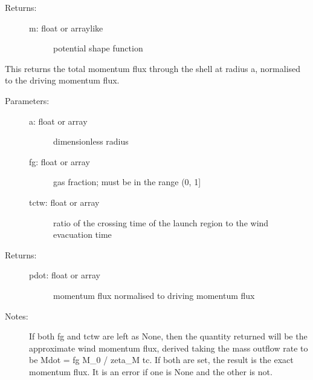 \documentclass[letterpaper,10pt,english]{sphinxmanual}
\begin{document}
\begin{fulllineitems}
\begin{fulllineitems}
\begin{description}
\begin{description}
\end{description}

\item[{Returns:}] \leavevmode\begin{description}
\item[{m: float or arraylike}] \leavevmode
potential shape function

\end{description}

\end{description}

\end{fulllineitems}


\begin{fulllineitems}
\label{fulldoc:despotic.winds.pwind.pdot}
This returns the total momentum flux through the shell at
radius a, normalised to the driving momentum flux.
\begin{description}
\item[{Parameters:}] \leavevmode\begin{description}
\item[{a: float or array}] \leavevmode
dimensionless radius

\item[{fg: float or array}] \leavevmode
gas fraction; must be in the range (0, 1{]}

\item[{tctw: float or array}] \leavevmode
ratio of the crossing time of the launch region to the
wind evacuation time

\end{description}

\item[{Returns:}] \leavevmode\begin{description}
\item[{pdot: float or array}] \leavevmode
momentum flux normalised to driving momentum flux

\end{description}

\item[{Notes:}] \leavevmode
If both fg and tctw are left as None, then the quantity
returned will be the approximate wind momentum flux,
derived taking the mass outflow rate to be Mdot = fg M\_0 /
zeta\_M tc. If both are set, the result is the exact
momentum flux. It is an error if one is None and the other
is not.


\end{description}
\end{fulllineitems}
\end{fulllineitems}
\end{document}
